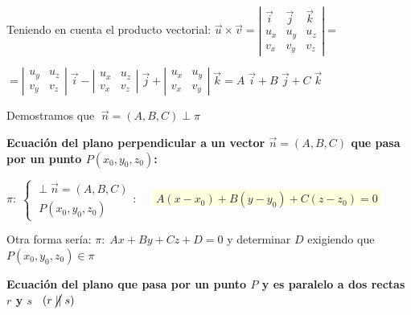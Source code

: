 \noindent \textcolor{gris}{Teniendo en cuenta el producto vectorial: $\vec u \times \vec v =
\left| \begin{matrix} \vec i& \vec j & \vec k\\u_x&u_y&u_z\\v_x&v_y&v_z\end{matrix} \right|=$}

\noindent \textcolor{gris}{$=  \left| \begin{matrix} u_y&u_z\\v_y&v_z \end{matrix} \right| \; \vec i-
 \left| \begin{matrix} u_x&u_z\\v_x&v_z \end{matrix} \right| \; \vec j+
 \left| \begin{matrix} u_x&u_y\\v_x&v_y \end{matrix} \right| \; \vec k =A\; \vec i+B\; \vec j+C\; \vec k$ }
 
 \noindent \textcolor{gris}{Demostramos que $\boxed{\;\vec n=(A,B,C)\; \bot \; \pi\;}$}

\vspace{3mm} \noindent \textbf{Ecuación del plano perpendicular a un vector $\vec n=(A,B,C)$ que pasa por un punto $P(x_0,y_0,z_0)$:}

$\pi:\; \begin{cases} \; \bot \; \vec n=(A,B,C) \\ \; P(x_0,y_0,z_0) \end{cases} :\quad $ \colorbox{LightYellow}{$\;A(x-x_0)+B(y-y_0)+C(z-z_0)=0\;$}

\noindent \textcolor{gris}{Otra forma sería: $\pi:\; Ax+By+Cz+D=0$ y determinar $D$ exigiendo que $P(x_0,y_0,z_0)\in \pi$}

\noindent \textbf{Ecuación del plano que pasa por un punto $P$ y es paralelo a dos rectas $r$ y $s$} \textcolor{gris}{$\;\;(r\; \cancel{||} \; s)$}



